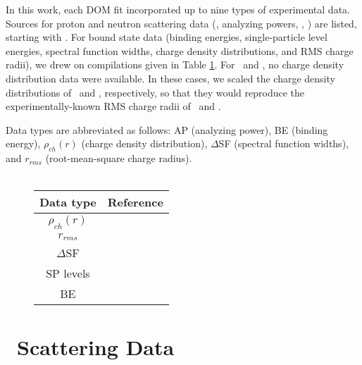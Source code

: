 \label{DOMDataSets}
In this work, each DOM fit incorporated up to nine types of experimental data. Sources for proton
and neutron scattering data (\el, analyzing powers, \rxn, \tot) are listed, starting with \oSix.
For bound state data (binding energies, single-particle level energies, spectral function widths,
charge density distributions, and RMS charge radii), we drew on compilations given in Table
\ref{BoundStateData}. For \oEight\ and \snTwelve, no charge density distribution data were
available. In these cases, we scaled the charge density distributions of \oSix\ and \snFour,
respectively, so that they would reproduce the experimentally-known RMS charge radii of
\oEight\ and \snTwelve.

Data types are abbreviated as follows: AP (analyzing power), BE (binding energy),
$\rho_{ch}(r)$ (charge density distribution), $\Delta$SF (spectral function widths), and
$r_{rms}$ (root-mean-square charge radius).
\\
\\
\begin{figure}[htp]
    \label{BoundStateData}
    \centering
    \begin{tabular}{c  c} 
        \toprule
        \bf{Data type} & \bf{Reference} \\
        \midrule
        $\rho_{ch}(r)$ & \cite{DeVries1987}\\
        $r_{rms}$ & \cite{DeVries1987}\\
        $\Delta$SF & \cite{Jacob1966, Jacob1973}\\
        SP levels & \cite{AME2016}\\
        BE & \cite{AME2016}\\
        \bottomrule
    \end{tabular}
\end{figure}

\pagebreak
\section{\oSix\ Scattering Data}

\begin{figure}[htp]
    \small
    \hspace*{\fill}%
    \begin{minipage}[t]{0.47\linewidth}
        \centering
        \vspace{0pt}
        
    \end{minipage}%
    \hfill
    \begin{minipage}[t]{0.47\linewidth}
        \centering
        \vspace{0pt}
        
    \end{minipage}
    \hspace*{\fill}
\end{figure}

